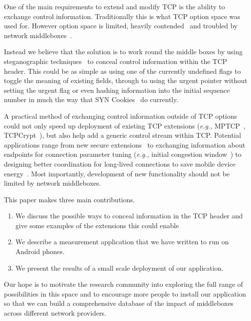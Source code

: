 \documentclass{sig-alternate-10pt}
\providecommand{\eg}{\emph{e.g.,} }
\begin{document}
One of the main requirements to extend and modify TCP is the ability to exchange control information. Traditionally this is what TCP option space was used for. However option space is limited, heavily contended~\cite{Handley:vj,Mazieres:uz} and troubled by network middleboxes~\cite{Honda,Guha2005tb,UntoldMiddlebox2011}.

Instead we believe that the solution is to work round the middle boxes by using steganographic techniques~\cite{Frczek:2012dl,Zielinska:2014fn,Rowland:1997vq,Murdoch:2005fz} to conceal control information within the TCP header. This could be as simple as using one of the currently undefined flags to toggle the meaning of existing fields, through to using the urgent pointer without setting the urgent flag or even hashing information into the initial sequence number in much the way that SYN Cookies~\cite{Eddy:2007to} do currently.

A practical method of exchanging control information outside of TCP options could not only speed up deployment of existing TCP extensions (\eg MPTCP~\cite{Handley:vj}, TCPCrypt~\cite{Mazieres:uz}), but also help add a generic control stream within TCP. Potential applications range from new secure extensions~\cite{Rescorla:R080FoGB} to exchanging information about endpoints for connection parameter tuning (\eg initial congestion window~\cite{Dukkipati:2010hs}) to designing better coordination for long-lived connections to save mobile device energy~\cite{Aucinas:2013uk}. Most importantly, development of new functionality should not be limited by network middleboxes.

This paper makes three main contributions. 
\begin{enumerate}
\item We discuss the possible ways to conceal information in the TCP header and give some examples of the extensions this could enable
\item We describe a measurement application that we have written to run on Android phones.  
\item We present the results of a small scale deployment of our application.
\end{enumerate}

Our hope is to motivate the research community into exploring the full range of possibilities in this space and to encourage more people to install our application so that we can build a comprehensive database of the impact of middleboxes across different network providers.

\end{document}
